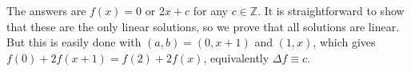 The answers are $f(x)=0$ or $2x+c$ for any $c\in\mathbb{Z}$. It is straightforward to show that these are the only linear solutions, so we prove that all solutions are linear. But this is easily done with $(a,b)=(0,x+1)$ and $(1,x)$, which gives $f(0)+2f(x+1)=f(2)+2f(x)$, equivalently $\Delta f\equiv c$.